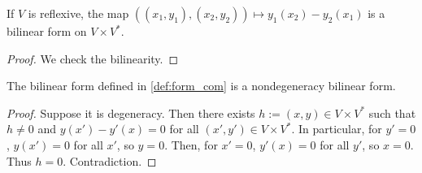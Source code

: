 \begin{definition}
    \label{def:form_com}
    \uses{}
    \leanok 

    If $V$ is reflexive, the map $((x_1,y_1),(x_2,y_2))\mapsto y_1(x_2)-y_2(x_1)$ is a bilinear form on 
    $V\times V^*$.
    \begin{proof}
        \leanok
        We check the bilinearity.
    \end{proof}
\end{definition}

\begin{proposition}[Nondegeneracy]
    \label{def:non_dege_form_com}
    \leanok 

    The bilinear form defined in \ref{def:form_com} is a nondegeneracy bilinear form.
    \begin{proof}
        \leanok
        Suppose it is degeneracy. Then there exists $h:=(x,y)\in V\times V^*$ such that
        $h\ne 0$ and $y(x')-y'(x)=0$ for all $(x',y')\in V\times V^*$.
        In particular, for $y'=0$, $y(x')=0$ for all $x'$, so $y=0$.
        Then, for $x'=0$, $y'(x)=0$ for all $y'$, so $x=0$.
        Thus $h=0$. Contradiction.
    \end{proof}
\end{proposition}